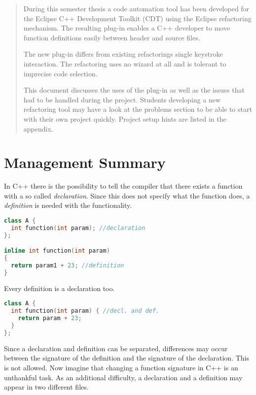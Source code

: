 \begin{abstract}

During this semester thesis a code automation tool has been developed for the 
Eclipse C++ Development Toolkit (CDT) using the Eclipse refactoring mechanism. 
The resulting plug-in enables a C++ developer to move function definitions easily 
between header and source files.

The new plug-in differs from existing refactorings single keystroke interaction. The
refactoring uses no wizard at all and is tolerant to imprecise code selection.

This document discusses the uses of the plug-in as well as the issues that had 
to be handled during the project. Students developing a new refactoring tool
may have a look at the problems section to be able to start with their own
project quickly. Project setup hints are listed in the appendix.
\end{abstract}

\chapter*{Management Summary}

In C++ there is the possibility to tell the compiler that there exists a
function with a so called \textit{declaration}. Since
this does not specify what the function does, a \textit{definition} is needed
with the functionality.

\begin{lstlisting}[caption={class with declaration and separated definition},
label={declanddef}, language=C++]
class A {
  int function(int param); //declaration
};

inline int function(int param)
{
  return param1 + 23; //definition
}
\end{lstlisting}

Every definition is a declaration too.

\begin{lstlisting}[caption={class with declaration and definition},
label={defonly}, language=C++]
class A {
  int function(int param) { //decl. and def.
    return param + 23;
  }
};
\end{lstlisting}

Since a declaration and definition can be separated, differences may occur
between the signature of the definition and the signature of the declaration.
This is not allowed. 
Now imagine that changing a function signature in C++ is an unthankful task.
As an additional difficulty, a declaration and a definition may appear in two
different files.


